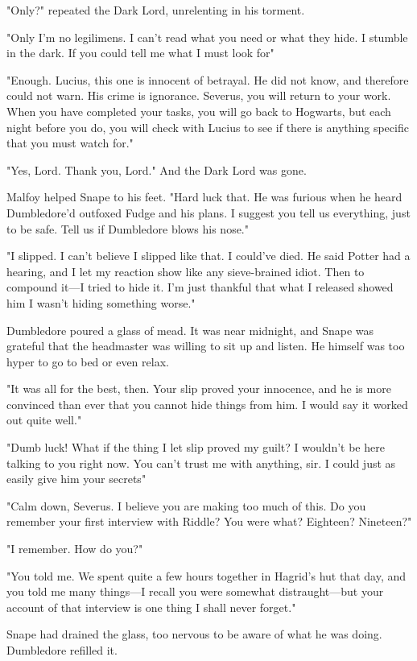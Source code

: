 "Only{\el}?" repeated the Dark Lord, unrelenting in his torment.

"Only I'm no legilimens. I can't read what you need or what they hide. I stumble in the dark. If you could tell me what I must look for{\el}"

"Enough. Lucius, this one is innocent of betrayal. He did not know, and therefore could not warn. His crime is ignorance. Severus, you will return to your work. When you have completed your tasks, you will go back to Hogwarts, but each night before you do, you will check with Lucius to see if there is anything specific that you must watch for."

"Yes, Lord. Thank you, Lord." And the Dark Lord was gone.

Malfoy helped Snape to his feet. "Hard luck that. He was furious when he heard Dumbledore'd outfoxed Fudge and his plans. I suggest you tell us everything, just to be safe. Tell us if Dumbledore blows his nose."

\sbreak

"I slipped. I can't believe I slipped like that. I could've died. He said Potter had a hearing, and I let my reaction show like any sieve-brained idiot. Then to compound it—I tried to hide it. I'm just thankful that what I released showed him I wasn't hiding something worse."

Dumbledore poured a glass of mead. It was near midnight, and Snape was grateful that the headmaster was willing to sit up and listen. He himself was too hyper to go to bed or even relax.

"It was all for the best, then. Your slip proved your innocence, and he is more convinced than ever that you cannot hide things from him. I would say it worked out quite well."

"Dumb luck! What if the thing I let slip proved my guilt? I wouldn't be here talking to you right now. You can't trust me with anything, sir. I could just as easily give him your secrets{\el}"

"Calm down, Severus. I believe you are making too much of this. Do you remember your first interview with Riddle? You were what? Eighteen? Nineteen?"

"I remember. How do you{\el}?"

"You told me. We spent quite a few hours together in Hagrid's hut that day, and you told me many things—I recall you were somewhat distraught—but your account of that interview is one thing I shall never forget."

Snape had drained the glass, too nervous to be aware of what he was doing. Dumbledore refilled it.

